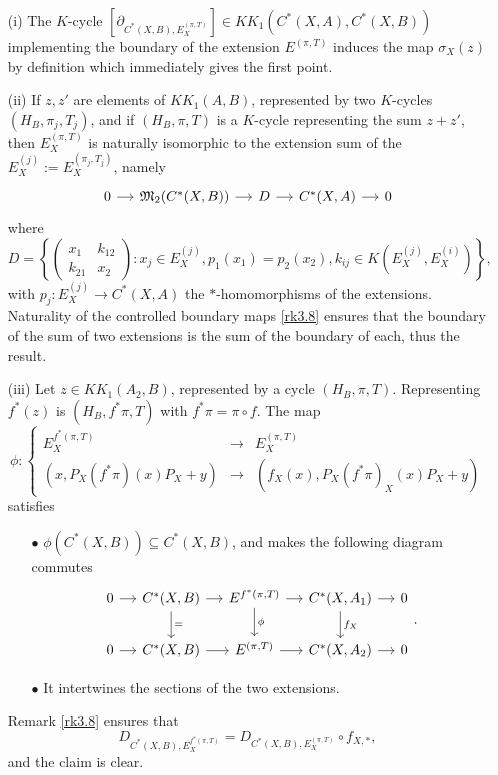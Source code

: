 \begin{dem}
\begin{enumerate}

\item[(i)]The $K$-cycle $[\partial_{C^*(X,B),E_X^{(\pi,T)}}]\in KK_1(C^*(X,A), C^*(X,B))$ implementing the boundary of the extension $E^{(\pi,T)}$ induces the map $\sigma_X(z)$ by definition which immediately gives the first point.

\item[(ii)] If $z,z'$ are elements of $KK_1(A,B)$, represented by two $K$-cycles $(H_B,\pi_j,T_j)$, and if $(H_B,\pi,T)$ is a $K$-cycle representing the sum $z+z'$, then $E_X^{(\pi,T)}$ is naturally isomorphic to the extension sum of the $E_X^{(j)}:=E_X^{(\pi_j,T_j)}$, namely
\[\begin{tikzcd}[column sep = small]
0\arrow{r} & \mathfrak M_2( C^*(X,B)) \arrow{r} & D \arrow{r} & C^*(X,A) \arrow{r} & 0
\end{tikzcd}\]
where 
\[D=\left\{\begin{pmatrix}x_1 & k_{12}\\ k_{21} & x_2\end{pmatrix} : x_j\in E_X^{(j)} , p_1(x_1)=p_2(x_2), k_{ij}\in K(E_X^{(j)},E_X^{(i)})\right\},\]
with $p_j : E_X^{(j)}\rightarrow C^*(X,A)$ the $*$-homomorphisms of the extensions. Naturality of the controlled boundary maps \ref{rk3.8} ensures that the boundary of the sum of two extensions is the sum of the boundary of each, thus the result.

\item[(iii)] Let $z\in KK_1(A_2,B)$, represented by a cycle $(H_B,\pi,T)$. Representing $f^*(z)$ is $(H_B,f^*\pi,T)$ with $f^*\pi=\pi \circ f$. The map 
\[\phi : \left\{\begin{array}{lll} E_X^{f^*(\pi,T)} & \rightarrow & E_X^{(\pi,T)} \\
( x, P_X(f^*\pi)(x)P_X+y) & \rightarrow & ( f_X(x), P_X(f^*\pi)_X(x)P_X+y) \end{array}\right. \]
satisfies
\begin{enumerate}
\item[$\bullet$] $\phi(C^*(X,B))\subseteq C^*(X,B)$, and makes the following diagram commutes
\[\begin{tikzcd}[column sep = small]
0\arrow{r} & C^*(X,B)\arrow{r}\arrow{d}{=} & E^{f^*(\pi,T)} \arrow{r}\arrow{d}{\phi}& C^*(X,A_1)\arrow{r}\arrow{d}{f_X} & 0\\
0\arrow{r} & C^*(X,B)\arrow{r} & E^{(\pi,T)} \arrow{r}& C^*(X,A_2)\arrow{r} & 0
\end{tikzcd}.\]
\item[$\bullet$] It intertwines the sections of the two extensions.
\end{enumerate}
Remark \ref{rk3.8} ensures that \[D_{C^*(X,B), E_X^{f^*(\pi,T)} } =  D_{C^*(X,B), E_X^{(\pi,T)} }\circ f_{X,*},\] 
and the claim is clear. %


\end{enumerate}
\end{dem}
